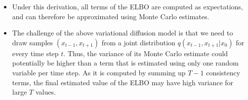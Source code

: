 
\begin{itemize}
	\item Under this derivation, all terms of the ELBO are computed as expectations, and can therefore be approximated using Monte Carlo estimates. 
\item The challenge of the above variational diffusion model is that we need to draw samples $(x_{t-1} , x_{t+1} )$ from a joint distribution $q(x_{t-1}, x_{t+1}|x_0)$ for every time step $t$. Thus, the variance of its Monte Carlo estimate could potentially be higher than a term that is estimated using only one random variable per time step. As it is computed by summing up $T-1$ consistency terms, the final estimated value of the ELBO may have high variance for large $T$ values.
\end{itemize}

